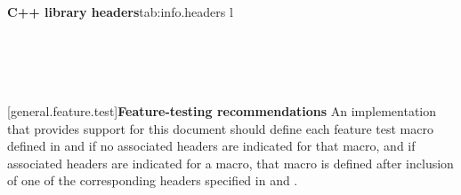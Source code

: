 

\begin{floattable}{\textbf{C++ library headers}}{tab:info.headers}
{l}
\topline
{} \\
 \\
 \\ 
 \\
 \\

\end{floattable}

[general.feature.test]{\textbf{Feature-testing recommendations}}
An implementation that provides support for this document should define each feature test macro defined in  and  if no associated headers are indicated for that macro, and if associated headers are indicated for a macro, that macro is defined after inclusion of one of the corresponding headers specified in  and .



